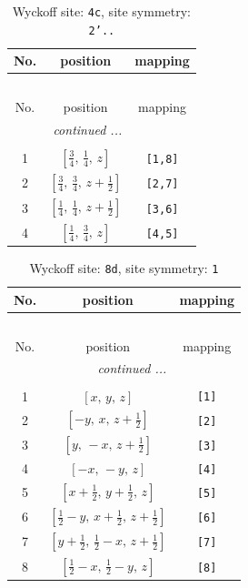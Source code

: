 \documentclass[fleqn,8pt]{jsarticle}
\begin{document}
\renewcommand{\arraystretch}{1.2}
\begin{longtable}{ccc}
\caption{Wyckoff site: {\tt 4c}, site symmetry: {\tt 2'..}}
 \\
 \hline \hline
No. & position & mapping \\ \hline \endfirsthead

\multicolumn{2}{l}{\tablename\ \thetable{}} \\
 \hline \hline
No. & position & mapping \\ \hline \endhead

 \hline \hline
\multicolumn{2}{r}{\footnotesize\it continued ...} \\ \endfoot

 \hline \hline
\multicolumn{2}{r}{} \\ \endlastfoot

1 & $\left[ \frac{3}{4},\, \frac{1}{4},\, z \right]$ & {\tt [1,8]} \\ \hline
2 & $\left[ \frac{3}{4},\, \frac{3}{4},\, z + \frac{1}{2} \right]$ & {\tt [2,7]} \\ \hline
3 & $\left[ \frac{1}{4},\, \frac{1}{4},\, z + \frac{1}{2} \right]$ & {\tt [3,6]} \\ \hline
4 & $\left[ \frac{1}{4},\, \frac{3}{4},\, z \right]$ & {\tt [4,5]} \\
\end{longtable}
\renewcommand{\arraystretch}{1.2}
\begin{longtable}{ccc}
\caption{Wyckoff site: {\tt 8d}, site symmetry: {\tt 1}}
 \\
 \hline \hline
No. & position & mapping \\ \hline \endfirsthead

\multicolumn{2}{l}{\tablename\ \thetable{}} \\
 \hline \hline
No. & position & mapping \\ \hline \endhead

 \hline \hline
\multicolumn{2}{r}{\footnotesize\it continued ...} \\ \endfoot

 \hline \hline
\multicolumn{2}{r}{} \\ \endlastfoot

1 & $\left[ x,\, y,\, z \right]$ & {\tt [1]} \\ \hline
2 & $\left[ - y,\, x,\, z + \frac{1}{2} \right]$ & {\tt [2]} \\ \hline
3 & $\left[ y,\, - x,\, z + \frac{1}{2} \right]$ & {\tt [3]} \\ \hline
4 & $\left[ - x,\, - y,\, z \right]$ & {\tt [4]} \\ \hline
5 & $\left[ x + \frac{1}{2},\, y + \frac{1}{2},\, z \right]$ & {\tt [5]} \\ \hline
6 & $\left[ \frac{1}{2} - y,\, x + \frac{1}{2},\, z + \frac{1}{2} \right]$ & {\tt [6]} \\ \hline
7 & $\left[ y + \frac{1}{2},\, \frac{1}{2} - x,\, z + \frac{1}{2} \right]$ & {\tt [7]} \\ \hline
8 & $\left[ \frac{1}{2} - x,\, \frac{1}{2} - y,\, z \right]$ & {\tt [8]} \\
\end{longtable}
\end{document}
